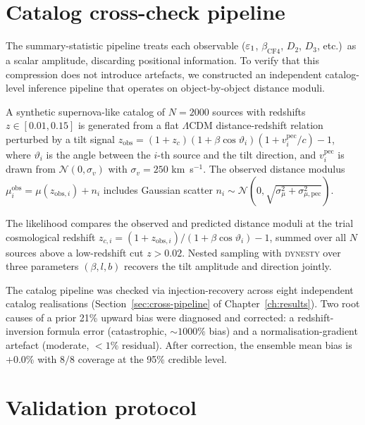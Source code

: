 \section{Catalog cross-check pipeline}
\label{sec:catalog}

The summary-statistic pipeline treats each observable
($\varepsilon_1$, $\beta_{\mathrm{CF4}}$, $D_2$, $D_3$, etc.)\ as
a scalar amplitude, discarding positional information.  To
verify that this compression does not introduce artefacts, we
constructed an independent catalog-level inference pipeline
that operates on object-by-object distance moduli.

A synthetic supernova-like catalog of $N = 2000$ sources with
redshifts $z \in [0.01, 0.15]$ is generated from a flat
$\Lambda$CDM distance-redshift relation perturbed by a
tilt signal
$z_{\mathrm{obs}} = (1 + z_c)(1 + \beta\cos\vartheta_i)
(1 + v_i^{\mathrm{pec}}/c) - 1$,
where $\vartheta_i$ is the angle between the $i$-th source and
the tilt direction, and $v_i^{\mathrm{pec}}$ is drawn from
$\mathcal{N}(0, \sigma_v)$ with $\sigma_v = 250$ km~s$^{-1}$.
The observed distance modulus
$\mu_i^{\mathrm{obs}} = \mu(z_{\mathrm{obs},i}) + n_i$
includes Gaussian scatter $n_i \sim \mathcal{N}(0,
\sqrt{\sigma_\mu^2 + \sigma_{\mu,\mathrm{pec}}^2})$.

The likelihood compares the observed and predicted
distance moduli at the trial cosmological redshift
$z_{c,i} = (1+z_{\mathrm{obs},i})/(1+\beta\cos\vartheta_i)-1$,
summed over all $N$ sources above a low-redshift cut $z > 0.02$.
Nested sampling with \textsc{dynesty} over three parameters
$(\beta, l, b)$ recovers the tilt amplitude and direction
jointly.

The catalog pipeline was checked via injection-recovery across
eight independent catalog realisations (Section~\ref{sec:cross-pipeline}
of Chapter~\ref{ch:results}).  Two root causes of a prior 21\%
upward bias were diagnosed and corrected: a redshift-inversion
formula error (catastrophic, $\sim 1000\%$ bias) and a
normalisation-gradient artefact (moderate, $< 1\%$ residual).
After correction, the ensemble mean bias is $+0.0\%$ with
$8/8$ coverage at the 95\% credible level.


\section{Validation protocol}\label{sec:validation}

